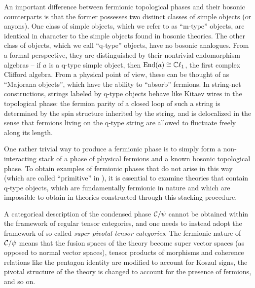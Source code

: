 An important difference between fermionic topological phases and their bosonic counterparts is that 
the former possesses two distinct classes of simple objects (or anyons). 
One class of simple objects, which we refer to as ``m-type'' objects, are identical in character
to the simple objects found in bosonic theories. 
The other class of objects, which we call ``q-type'' objects, have no bosonic analogues. 
From a formal perspective, they are distinguished by their nontrivial endomorphism algebras -- if 
$a$ is a q-type simple object, then $\text{End}(a) \cong \mathbb{C}\ell_1$, the first complex Clifford algebra. 
From a physical point of view, these can be thought of as ``Majorana objects'', which have the ability 
to ``absorb'' fermions. 
In string-net constructions, strings labeled by q-type objects behave like Kitaev wires in the 
topological phase: the fermion parity of a closed loop of such a string is determined by 
the spin structure inherited by the string, and is delocalized in the sense that fermions living on the q-type string are allowed to fluctuate freely along its length.

One rather trivial way to produce a fermionic phase is to simply form a non-interacting stack of a phase of physical fermions 
and a known bosonic topological phase. 
To obtain examples of fermionic phases that do not arise in this way (which are called ``primitive'' in \cite{Lan2016b}),
it is essential to examine theories that contain q-type objects, which are fundamentally fermionic in nature and which are impossible to obtain in theories constructed through this stacking procedure. 

A categorical description of the condensed phase $\mathcal{C} / \psi$ cannot be obtained within the framework 
of regular tensor categories, and one needs to instead adopt the framework of so-called {\it super pivotal tensor categories}. 
The fermionic nature of $\mathcal{C} / \psi$ means that the fusion spaces of the theory become super vector spaces 
(as opposed to normal vector spaces), 
tensor products of morphisms and coherence relations like the pentagon identity are modified to account for Koszul signs, 
the pivotal structure of the theory is changed to account for the presence of fermions, and so on.

